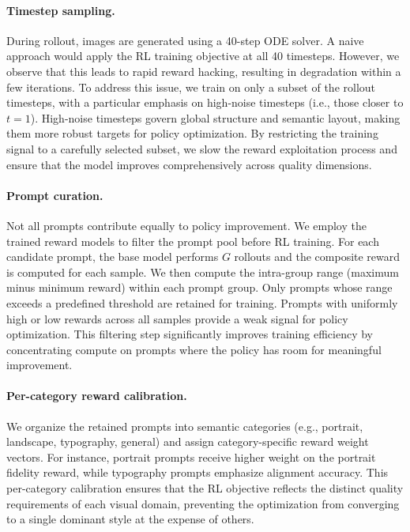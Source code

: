 \documentclass{llmxive}
\begin{document}
\paragraph{Timestep sampling.} During rollout, images are generated using a 40-step ODE solver. A naive approach would apply the RL training objective at all 40 timesteps. However, we observe that this leads to rapid reward hacking, resulting in degradation within a few iterations. To address this issue, we train on only a subset of the rollout timesteps, with a particular emphasis on high-noise timesteps (i.e., those closer to $t=1$). High-noise timesteps govern global structure and semantic layout, making them more robust targets for policy optimization. By restricting the training signal to a carefully selected subset, we slow the reward exploitation process and ensure that the model improves comprehensively across quality dimensions.

\paragraph{Prompt curation.} Not all prompts contribute equally to policy improvement. We employ the trained reward models to filter the prompt pool before RL training. For each candidate prompt, the base model performs $G$ rollouts and the composite reward is computed for each sample. We then compute the intra-group range (maximum minus minimum reward) within each prompt group. Only prompts whose range exceeds a predefined threshold are retained for training. Prompts with uniformly high or low rewards across all samples provide a weak signal for policy optimization. This filtering step significantly improves training efficiency by concentrating compute on prompts where the policy has room for meaningful improvement.

\paragraph{Per-category reward calibration.} We organize the retained prompts into semantic categories (e.g., portrait, landscape, typography, general) and assign category-specific reward weight vectors. For instance, portrait prompts receive higher weight on the portrait fidelity reward, while typography prompts emphasize alignment accuracy. This per-category calibration ensures that the RL objective reflects the distinct quality requirements of each visual domain, preventing the optimization from converging to a single dominant style at the expense of others.
\end{document}
